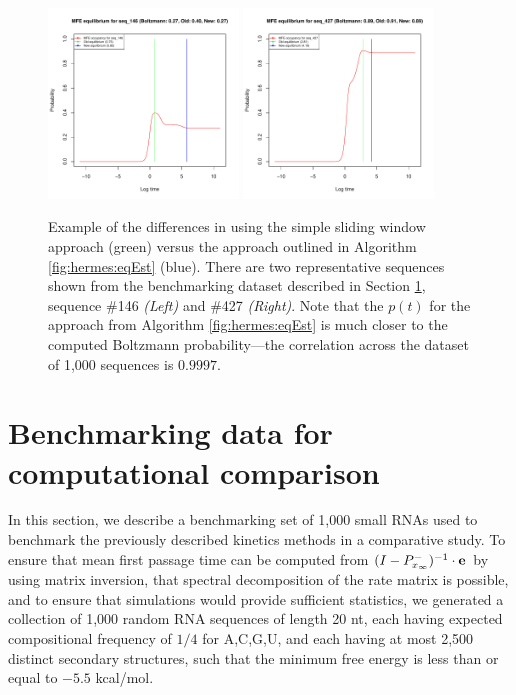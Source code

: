 \begin{figure}[!ht]
\centering
\includegraphics[width=0.45\textwidth]{Figures/Hermes/eqEstFromRnaEqSeq146.pdf}
\quad
\includegraphics[width=0.45\textwidth]{Figures/Hermes/eqEstFromRnaEqSeq427.pdf}
\caption{Example of the differences in using the simple sliding window
approach (green) versus the approach outlined in Algorithm \ref{fig:hermes:eqEst}
(blue). There are two representative sequences shown from the benchmarking
dataset described in Section \ref{sec:hermes:benchdata}, sequence \#146
{\em (Left)} and \#427 {\em (Right)}. Note that the $p(t)$ for the approach from
Algorithm \ref{fig:hermes:eqEst} is much closer to the computed Boltzmann
probability---the correlation across the dataset of 1,000 sequences is
$0.9997$.}
\label{fig:hermes:eqEstFromRnaEq}
\end{figure}

\section{Benchmarking data for computational comparison}
\label{sec:hermes:benchdata}

In this section, we describe a
benchmarking set of 1,000 small RNAs used to benchmark the previously
described kinetics methods in a comparative study. To ensure that mean
first passage time can be computed from
$(I - P^{-}_{x_\infty})^{-1} \cdot {\bf e}$ by using matrix
inversion, that spectral decomposition of the rate matrix is possible,
and to ensure that \kinfold simulations would provide sufficient
statistics, we generated a collection of 1,000 random RNA sequences of
length 20 nt, each having expected compositional frequency of $1/4$
for A,C,G,U, and each having at most 2,500 distinct secondary
structures, such that the minimum free energy is less than or equal to
$-5.5$ kcal/mol.

